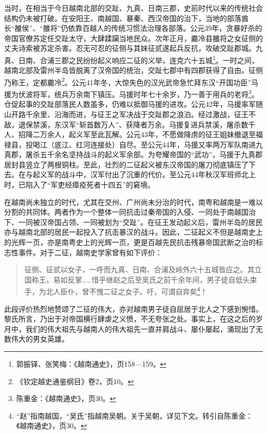 当时，在相当于今日越南北部的交趾、九真、日南三郡，史前时代以来的传统社会结构仍未被打破。在安阳王、南越国、暴秦、西汉帝国的治下，当地的部落酋长“雒侯”、“雒将”仍依靠百越人的传统习惯法治理各部落。公元39年，贪暴好杀的帝国官僚苏定任交趾太守，大肆蹂躏当地民众。次年正月，麊冷县雒将之女征侧的丈夫诗索被苏定杀害。忍无可忍的征侧与其妹征贰遂起兵反抗，攻破交趾郡城。九真、日南、合浦三郡之民纷纷起义响应二征的义举，连克六十五城\footnote{郭振铎、张笑梅：《越南通史》，页158—159。}。一时之间，越南北部及雷州半岛皆脱离了汉帝国的统治，交趾七郡中有四郡获得了自由。征侧乃称王，定都麊冷\footnote{《钦定越史通鉴纲目》卷2，页10。}。公元41年冬，大惊失色的汉光武帝急忙拜东汉“开国功臣”马援为伏波将军，统兵万余南下镇压。马援时年七十余岁，乃一善于用兵的老将\footnote{陈重金：《越南通史》，页30。}。仓促起事的交趾部落民人数虽多，仍难以抵御马援的进攻。公元42年，马援率军随山开路千余里、沿海而进，与征王之军决战于交趾郡之浪泊。经过激战，征王不敌，退保禁溪，东汉军“斩首数万人”、获降者万余。马援复进兵禁溪，屠杀数千人、招降二万余人，起义军至此瓦解。公元43年，不愿做降虏的征王姐妹撤退至福禄县，投喝江（底江、红河连接处）自尽。至公元44年，马援又率两万军队南进九真郡，屠杀五千余名坚持战斗的起义军余部。为夸耀帝国的“武功”，马援于九真郡居封县竖立了两根铜柱。至此，壮烈的二征起义被东汉帝国的屠刀彻底镇压了下去。在与起义军的战斗中，汉军付出了沉重的代价。至公元44年秋汉军班师北上时，已陷入了“军吏经瘴疫死者十四五”的窘境。

在越南尚未独立的时代，尤其在交州、广州尚未分治的时代，南粤和越南是一难以分割的共同体。两者作为一个整体一同抗击过秦帝国的入侵、一同处于南越国治下、一同被汉帝国占领、一同被划为“交趾”。在征王发动起义后，雷州半岛的居民亦与越南北部的居民一起投入了抗击暴汉的战斗。因此，二征起义不但是越南史上的光辉一页，亦是南粤史上的光辉一页，更是百越先民抗击残暴帝国武断之治的标志性事件。对于二征，越南史学家曾有如下评价：

\begin{quote}
	征侧、征贰以女子，一呼而九真、日南、合浦及岭外六十五城皆应之。其立国称王，易如反掌……惜乎继赵之后至吴氏之前千余年间，男子徒自低头束手，为北人臣仆，曾不愧二征之女子。吁，可谓自弃矣\footnote{“赵”指南越国，“吴氏”指越南吴朝。关于吴朝，详见下文。转引自陈重金：《越南通史》，页30。}！
\end{quote}

此段评价热烈地赞颂了二征的伟大，亦对越南男子徒自屈居于北人之下感到惋惜。黎氏所言，乃出于对帝国横行肆虐之义愤，不无夸张之处。事实上，在这之后的岁月中，我们的伟大祖先与越南人的伟大祖先一直并肩战斗、屡仆屡起，涌现出了无数伟大的男女英雄。


